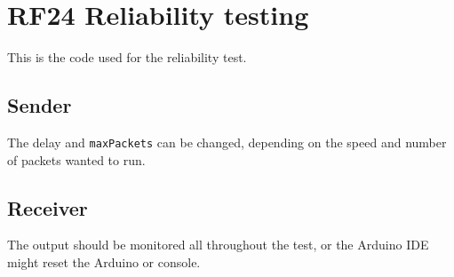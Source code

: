 \chapter{RF24 Reliability testing}\label{cha:reliabilityCode}
This is the code used for the reliability test.

\section{Sender}
The delay and \verb!maxPackets! can be changed, depending on the speed and number of packets wanted to run.


\section{Receiver}
The output should be monitored all throughout the test, or the Arduino IDE might reset the Arduino or console.
